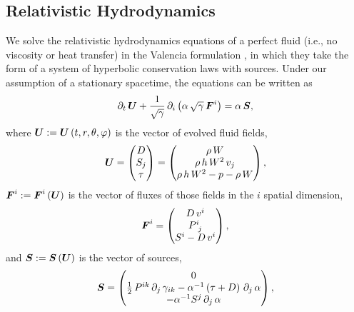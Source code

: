 
\subsection{Relativistic Hydrodynamics}

We solve the relativistic hydrodynamics equations
of a perfect fluid (i.e., no viscosity or heat transfer)
in the Valencia formulation
\citep{bfi1997,rz2013}, in which they take the form of a
system of hyperbolic conservation laws with sources. Under our assumption of
a stationary spacetime, the equations can be written as
\begin{equation}\label{eq.cLaws}
  \partial_{t}\,\boldsymbol{U}
  +\frac{1}{\sqrt{\gamma}}\,
  \partial_{i}\left(\alpha\,\sqrt{\gamma}\,\boldsymbol{F}^{i}\right)=\alpha\,\boldsymbol{S},
\end{equation}
where $\boldsymbol{U}:=\boldsymbol{U}\left(t,r,\theta,\varphi\right)$
is the vector of evolved fluid fields,
\begin{equation}
  \boldsymbol{U}
  =\begin{pmatrix}
  D\\
  S_{j}\\
  \tau
  \end{pmatrix}
  =\begin{pmatrix}
  \rho\,W\\
  \rho\,h\,W^{2}\,v_{j}\\
  \rho\,h\,W^{2}-p-\rho\,W
  \end{pmatrix},
\end{equation}
$\boldsymbol{F}^{i}:=\boldsymbol{F}^{i}\left(\boldsymbol{U}\right)$ is the vector of fluxes of those
fields in the $i$\th{} spatial dimension,
\begin{equation}
  \boldsymbol{F}^{i}
  =\begin{pmatrix}
  D\,v^{i}\\
  P^{i}_{~j}\\
  S^{i}-D\,v^{i}
  \end{pmatrix},
\end{equation}
and $\boldsymbol{S}:=\boldsymbol{S}\left(\boldsymbol{U}\right)$ is the vector of sources,
\begin{equation}
  \boldsymbol{S}
  =\begin{pmatrix}
  0\\
  \frac{1}{2}\,P^{ik}\,\partial_{j}\,\gamma_{ik}
  -\alpha^{-1}\left(\tau+D\right)\,\partial_{j}\,\alpha\\
  -\alpha^{-1}S^{j}\,\partial_{j}\,\alpha
  \end{pmatrix},
\end{equation}
